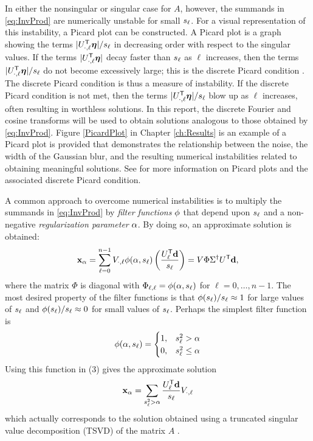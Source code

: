 In either the nonsingular or singular case for $A$, however, the summands in \eqref{eq:InvProd} are numerically unstable for small $s_\ell$. For a visual representation of this instability, a Picard plot can be constructed. A Picard plot is a graph showing the terms $|{U}^\mathsf{T}_{\cdot,\ell}\bm{\eta}|/s_\ell$ in decreasing order with respect to the singular values. If the terms $|{U}^\mathsf{T}_{\cdot,\ell}\bm{\eta}|$ decay faster than $s_\ell$ as $\ell$ increases, then the terms $|{U}^\mathsf{T}_{\cdot,\ell}\bm{\eta}|/s_\ell$ do not become excessively large; this is the discrete Picard condition \cite{ABT}. The discrete Picard condition is thus a measure of instability. If the discrete Picard condition is not met, then the terms $|{U}^\mathsf{T}_{\cdot,\ell}\bm{\eta}|/s_\ell$ blow up as $\ell$ increases, often resulting in worthless solutions. In this report, the discrete Fourier and cosine transforms will be used to obtain solutions analogous to those obtained by \eqref{eq:InvProd}. Figure \ref{PicardPlot} in Chapter \ref{ch:Results} is an example of a Picard plot is provided that demonstrates the relationship between the noise, the width of the Gaussian blur, and the resulting numerical instabilities related to obtaining meaningful solutions. See \cite{Hansen1990} for more information on Picard plots and the associated discrete Picard condition. \par 
A common approach to overcome numerical instabilities is to multiply the summands in \eqref{eq:InvProd} by \textit{filter functions} $\phi$ that depend upon $s_\ell$ and a non-negative \textit{regularization parameter} $\alpha$. By doing so, an approximate solution is obtained:
\begin{equation}
\mathbf{x}_\alpha = \sum_{\ell = 0}^{n-1} V_{\cdot,\ell}\phi(\alpha,s_\ell)\left(\frac{{{U}^\mathsf{T}_\ell}\mathbf{d}}{s_\ell}\right) = V\Phi\Sigma^\dagger {U}^\mathsf{T}\mathbf{d},
\label{eq:ApproxSol}
\end{equation}
where the matrix $\Phi$ is diagonal with $\Phi_{\ell,\ell} = \phi(\alpha,s_\ell)$ for $\ell = 0,\ldots,{n-1}$. The most desired property of the filter functions is that $\phi(s_\ell)/s_\ell \approx 1$  for large values of $s_\ell$ and $\phi(s_\ell)/s_\ell \approx 0$ for small values of $s_\ell$.  Perhaps the simplest filter function is
\[\phi(\alpha,s_\ell) = \begin{cases}
1, & s_\ell^2 > \alpha \\
0, & s_\ell^2 \leq \alpha
\end{cases}\]
Using this function in (3) gives the approximate solution
\[\mathbf{x}_\alpha = \sum_{s_\ell^2 > \alpha} \frac{{{U}^\mathsf{T}_\ell}\mathbf{d}}{s_\ell}V_{\cdot,\ell}\]
which actually corresponds to the solution obtained using a truncated singular value decomposition (TSVD) of the matrix $A$ \cite[p.~3-5]{Vogel:2002}. \par

